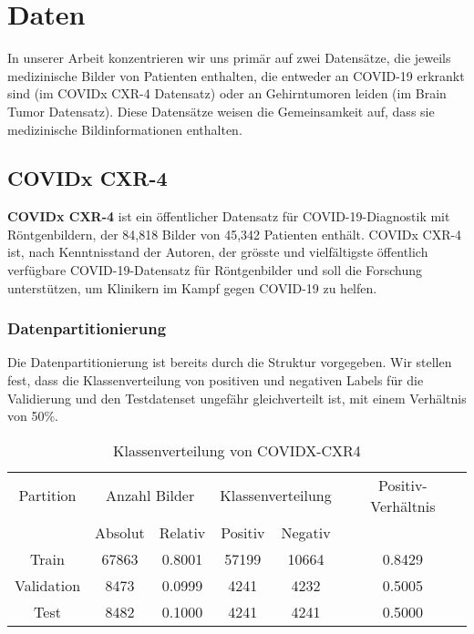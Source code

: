 \section{Daten}

In unserer Arbeit konzentrieren wir uns primär auf zwei Datensätze, die jeweils medizinische Bilder von Patienten enthalten, die entweder an COVID-19 erkrankt sind (im COVIDx CXR-4 Datensatz) oder an Gehirntumoren leiden (im Brain Tumor Datensatz). Diese Datensätze weisen die Gemeinsamkeit auf, dass sie medizinische Bildinformationen enthalten. 

\subsection{COVIDx CXR-4}
\textbf{COVIDx CXR-4} \cite{wu_covidx_2023} ist ein öffentlicher Datensatz für COVID-19-Diagnostik mit Röntgenbildern, der 84,818 Bilder von 45,342 Patienten enthält. COVIDx CXR-4 ist, nach Kenntnisstand der Autoren, der grösste und vielfältigste öffentlich verfügbare COVID-19-Datensatz für Röntgenbilder und soll die Forschung unterstützen, um Klinikern im Kampf gegen COVID-19 zu helfen.


\subsubsection{Datenpartitionierung}

Die Datenpartitionierung ist bereits durch die Struktur vorgegeben. Wir stellen fest, dass die Klassenverteilung von positiven und negativen Labels für die Validierung und den Testdatenset ungefähr gleichverteilt ist, mit einem Verhältnis von 50\%. 

\begin{table}[h]
\centering
\begin{tabular}{@{}cccccc@{}}
\toprule
Partition & \multicolumn{2}{c}{Anzahl Bilder} & \multicolumn{2}{c}{Klassenverteilung} & Positiv-Verhältnis\\ 
\cmidrule(lr){2-3} \cmidrule(lr){4-5} 
          & Absolut & Relativ & Positiv & Negativ & \\ 
\midrule
Train      & 67863 & 0.8001 & 57199 & 10664 & 0.8429 \\
Validation & 8473  & 0.0999 & 4241  & 4232  & 0.5005 \\
Test       & 8482  & 0.1000 & 4241  & 4241  & 0.5000 \\ 
\bottomrule
\end{tabular}
\caption{Klassenverteilung von COVIDX-CXR4}
\label{tab:covidx-klassenverteilung}
\end{table}




